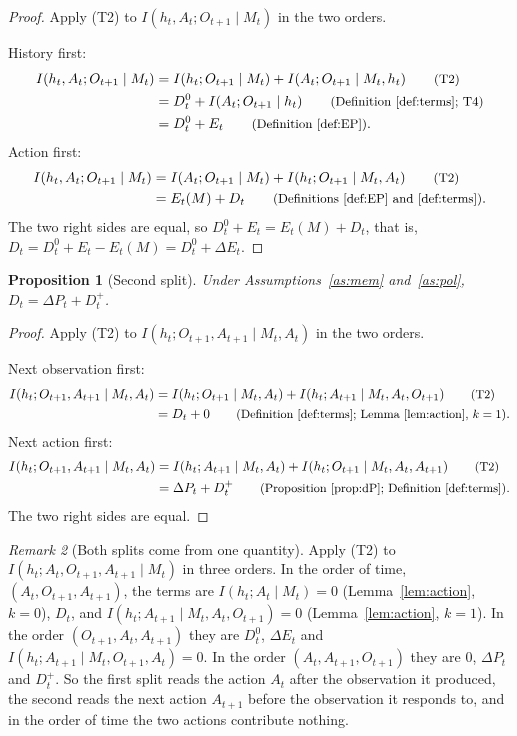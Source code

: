 \documentclass{article}
\newtheorem{proposition}{Proposition}[section]
\theoremstyle{definition}
\theoremstyle{remark}
\newtheorem{remark}[proposition]{Remark}
\newcommand{\dE}{\Delta E}
\newcommand{\dP}{\Delta P}
\newcommand{\why}[1]{\tag*{\small(#1)}}
\begin{document}
\begin{proof}
Apply (T2) to $I(h_t,A_t;O_{t+1}\mid M_t)$ in the two orders.

History first:
\begin{align*}
I(h_t,A_t;O_{t+1}\mid M_t)&=I(h_t;O_{t+1}\mid M_t)+I(A_t;O_{t+1}\mid M_t,h_t) \why{T2}\\
&=D^0_t+I(A_t;O_{t+1}\mid h_t) \why{Definition~\ref{def:terms}; T4}\\
&=D^0_t+E_t \why{Definition~\ref{def:EP}}.
\end{align*}
Action first:
\begin{align*}
I(h_t,A_t;O_{t+1}\mid M_t)&=I(A_t;O_{t+1}\mid M_t)+I(h_t;O_{t+1}\mid M_t,A_t) \why{T2}\\
&=E_t(M)+D_t \why{Definitions~\ref{def:EP} and~\ref{def:terms}}.
\end{align*}
The two right sides are equal, so $D^0_t+E_t=E_t(M)+D_t$, that is, $D_t=D^0_t+E_t-E_t(M)=D^0_t+\dE_t$.
\end{proof}

\begin{proposition}[Second split]\label{prop:split2}
Under Assumptions~\ref{as:mem} and~\ref{as:pol}, $D_t=\dP_t+D^+_t$.
\end{proposition}

\begin{proof}
Apply (T2) to $I(h_t;O_{t+1},A_{t+1}\mid M_t,A_t)$ in the two orders.

Next observation first:
\begin{align*}
I(h_t;O_{t+1},A_{t+1}\mid M_t,A_t)&=I(h_t;O_{t+1}\mid M_t,A_t)+I(h_t;A_{t+1}\mid M_t,A_t,O_{t+1}) \why{T2}\\
&=D_t+0 \why{Definition~\ref{def:terms}; Lemma~\ref{lem:action}, $k=1$}.
\end{align*}
Next action first:
\begin{align*}
I(h_t;O_{t+1},A_{t+1}\mid M_t,A_t)&=I(h_t;A_{t+1}\mid M_t,A_t)+I(h_t;O_{t+1}\mid M_t,A_t,A_{t+1}) \why{T2}\\
&=\dP_t+D^+_t \why{Proposition~\ref{prop:dP}; Definition~\ref{def:terms}}.
\end{align*}
The two right sides are equal.
\end{proof}

\begin{remark}[Both splits come from one quantity]\label{rem:orders}
Apply (T2) to $I(h_t;A_t,O_{t+1},A_{t+1}\mid M_t)$ in three orders. In the order of time, $(A_t,O_{t+1},A_{t+1})$, the terms are $I(h_t;A_t\mid M_t)=0$ (Lemma~\ref{lem:action}, $k=0$), $D_t$, and $I(h_t;A_{t+1}\mid M_t,A_t,O_{t+1})=0$ (Lemma~\ref{lem:action}, $k=1$). In the order $(O_{t+1},A_t,A_{t+1})$ they are $D^0_t$, $\dE_t$ and $I(h_t;A_{t+1}\mid M_t,O_{t+1},A_t)=0$. In the order $(A_t,A_{t+1},O_{t+1})$ they are $0$, $\dP_t$ and $D^+_t$. So the first split reads the action $A_t$ after the observation it produced, the second reads the next action $A_{t+1}$ before the observation it responds to, and in the order of time the two actions contribute nothing.
\end{remark}
\end{document}
